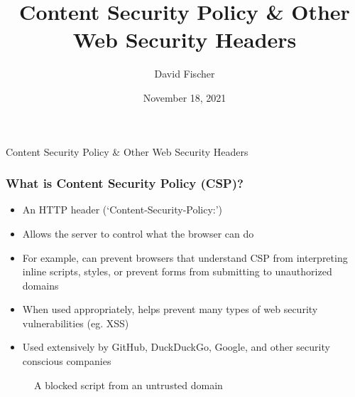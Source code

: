 \documentclass[handout]{beamer}
\title{Content Security Policy \& Other Web Security Headers}
\author{David Fischer}
\date{November 18, 2021}
\begin{document}
\maketitle

\begin{frame}
\frametitle{}
  {\huge Content Security Policy \& Other Web Security Headers}
\end{frame}


\begin{frame}
  \frametitle{What is Content Security Policy (CSP)?}
  \begin{itemize}
    \item An HTTP header (`Content-Security-Policy:')
    \item Allows the server to control what the browser can do
    \item For example, can prevent browsers that understand CSP from interpreting inline scripts, styles, or prevent forms from submitting to unauthorized domains
    \item When used appropriately, helps prevent many types of web security vulnerabilities (eg. XSS)
    \item Used extensively by GitHub, DuckDuckGo, Google, and other security conscious companies
  \end{itemize}
\end{frame}


\begin{frame}
  \begin{figure}[p]
    \centering
    \caption{A blocked script from an untrusted domain}
  \end{figure}
\end{frame}
\end{document}
